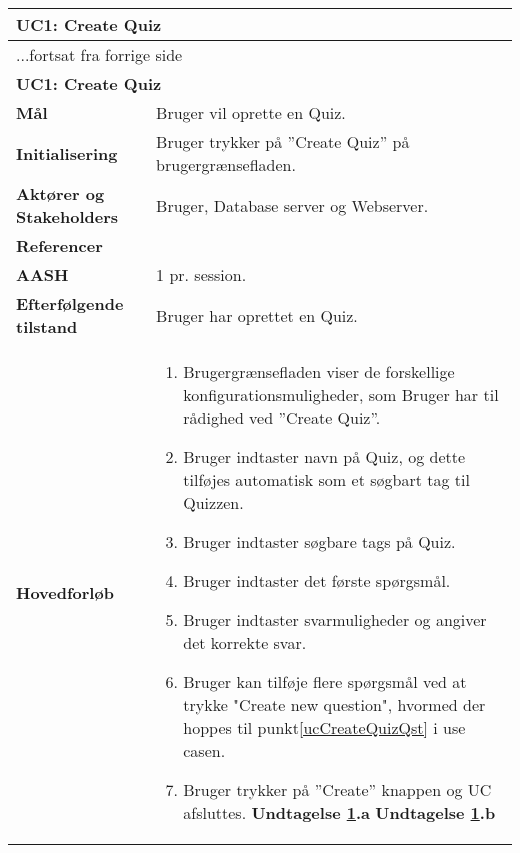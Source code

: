 \begin{center} \centering \label{ucCreateQuiz}
	\begin{longtable}{|p{4.6cm}|p{9.4cm}|}  %
	\hline
		\multicolumn{2}{|l|}{\textbf{UC1: Create Quiz}} \\\hline
		\endfirsthead
		
		\multicolumn{2}{l}{...fortsat fra forrige side} \\ \hline %
		\multicolumn{2}{|l|}{\textbf{UC1: Create Quiz}} \\\hline
		\endhead	
		
		\textbf{Mål}						&Bruger vil oprette en Quiz.
		\\\hline
		\textbf{Initialisering}			& Bruger trykker på ''Create Quiz'' på brugergrænsefladen.
		\\\hline
		\textbf{Aktører og Stakeholders}	&Bruger, Database server og Webserver.
		\\\hline 
		\textbf{Referencer}				&%
		\\\hline
		\textbf{AASH}					&1 pr. session.
		\\\hline
		\textbf{Efterfølgende tilstand}	&Bruger har oprettet en Quiz.
		\\\hline
		\textbf{Hovedforløb}					
			&\begin{enumerate}
				\item Brugergrænsefladen viser de forskellige konfigurationsmuligheder, som Bruger har til rådighed ved ''Create Quiz''.
				\item \label{ucCreateQuizName} Bruger indtaster navn på Quiz, og dette tilføjes automatisk som et søgbart tag til Quizzen.
				\item Bruger indtaster søgbare tags på Quiz.
				\item \label{ucCreateQuizQst} Bruger indtaster det første spørgsmål.
				\item Bruger indtaster svarmuligheder og angiver det korrekte svar.
				\item Bruger kan tilføje flere spørgsmål ved at trykke "Create new question", hvormed der hoppes til punkt\ref{ucCreateQuizQst} i use casen.
				\item \label{ucCreateQuizDone} Bruger trykker på ''Create'' knappen og UC afsluttes.
				\textbf{Undtagelse \ref{ucCreateQuizDone}.a}
				\textbf{Undtagelse \ref{ucCreateQuizDone}.b}
				

\end{enumerate}
\end{longtable}
\end{center}
